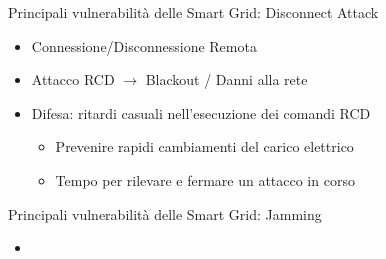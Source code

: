 
\begin{frame}{Principali vulnerabilità delle Smart Grid: Disconnect Attack}
	\begin{itemize}[<+- | alert@+>]
		\item Connessione/Disconnessione Remota
		\item Attacco RCD $\rightarrow$ Blackout / Danni alla rete
		\item Difesa: ritardi casuali nell'esecuzione dei comandi RCD
		\begin{itemize}
			\item Prevenire rapidi cambiamenti del carico elettrico
			\item Tempo per rilevare e fermare un attacco in corso
		\end{itemize}
	\end{itemize}
\end{frame}


\begin{frame}{Principali vulnerabilità delle Smart Grid: Jamming}
	\begin{itemize}[<+- | alert@+>]
		\item 
	\end{itemize}
\end{frame}